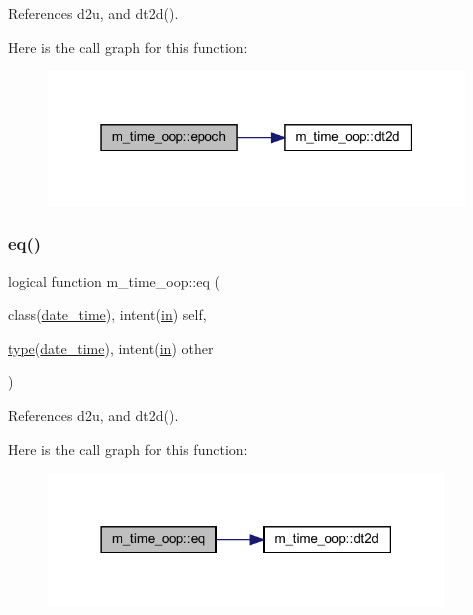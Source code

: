 References d2u, and dt2d().

Here is the call graph for this function\+:
\nopagebreak
\begin{figure}[H]
\begin{center}
\leavevmode
\includegraphics[width=313pt]{namespacem__time__oop_a50cb1ad3024b3b44b004382323bea7a9_cgraph}
\end{center}
\end{figure}
\mbox{\label{namespacem__time__oop_afcc34853af3eda020eb5ff802e04964d}} 
\subsubsection{\texorpdfstring{eq()}{eq()}}
{\footnotesize\ttfamily logical function m\+\_\+time\+\_\+oop\+::eq (\begin{DoxyParamCaption}\item[{class(\hyperlink{structm__time__oop_1_1date__time}{date\+\_\+time}), intent(\hyperlink{M__journal_83_8txt_afce72651d1eed785a2132bee863b2f38}{in})}]{self,  }\item[{\hyperlink{stop__watch_83_8txt_a70f0ead91c32e25323c03265aa302c1c}{type}(\hyperlink{structm__time__oop_1_1date__time}{date\+\_\+time}), intent(\hyperlink{M__journal_83_8txt_afce72651d1eed785a2132bee863b2f38}{in})}]{other }\end{DoxyParamCaption})\hspace{0.3cm}{\ttfamily [private]}}



References d2u, and dt2d().

Here is the call graph for this function\+:
\nopagebreak
\begin{figure}[H]
\begin{center}
\leavevmode
\includegraphics[width=297pt]{namespacem__time__oop_afcc34853af3eda020eb5ff802e04964d_cgraph}
\end{center}
\end{figure}
\mbox{\label{namespacem__time__oop_a78bb598e3481faa48df9733a3f9ae060}} 
